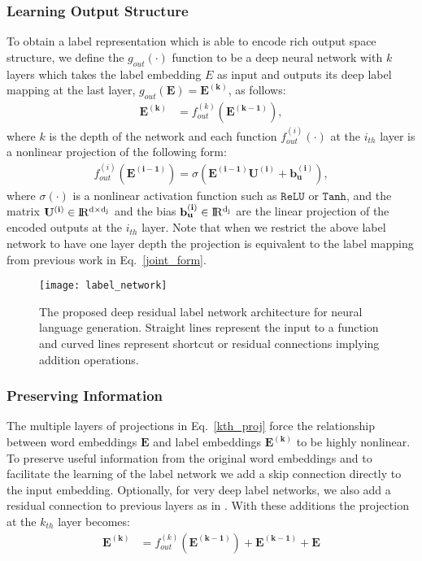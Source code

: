 \documentclass{article}
\begin{document}
\subsubsection{Learning Output Structure}
To obtain a label representation which is able to encode rich output space structure, we define the $g_{out}(\cdot)$ function to be a deep neural network with $k$ layers which takes the label embedding $E$ as input and outputs its deep label mapping at the last layer, $g_{out}(\mathbf{E}) = \mathbf{{E}^{(k)}}$,  as follows: 
\begin{align}
     \mathbf{{E}^{(k)}}    & = f^{(k)}_{out}(\mathbf{{E}^{(k-1)}}) \label{kth_proj}, 
\end{align}
\noindent where $k$ is the depth of the network and 
each function $f^{(i)}_{out}(\cdot)$ at the $i_{th}$ layer is a nonlinear projection of the following form: 
\begin{align}
    f^{(i)}_{out}(\mathbf{{E}^{(i-1)}}) = \sigma(\mathbf{E^{(i-1)}}\mathbf{U^{(i)}} + \mathbf{b^{(i)}_u}),
    \label{drill_proj}
\end{align}
where $\sigma(\cdot)$ is a nonlinear activation function such as $\texttt{ReLU}$ or $\texttt{Tanh}$, and the matrix $\mathbf{U^{(i)}} \in \rm I\!R^{d \times d_j}$ and the bias $\mathbf{b^{(i)}_{u}} \in \rm I\!R^{d_j}$ are the linear projection of the encoded outputs at the $i_{th}$ layer. Note that when we restrict the above label network to have  one layer depth the projection is equivalent to the label mapping from previous work in Eq.~\ref{joint_form}.


\begin{figure*}
 	\centering
 	\hspace{5mm}\texttt{[image: label\_network]}
 	\vspace{-2mm}
 	\caption{The proposed deep residual label network architecture for neural language generation. Straight lines represent the input to a function and curved lines represent shortcut or residual connections implying addition operations.}
 	\label{schema-mini}
\end{figure*}

\subsubsection{Preserving Information}
The multiple layers of projections in Eq.~\ref{kth_proj} force the relationship between word embeddings $\mathbf{E}$ and label embeddings $\mathbf{{E}^{(k)}}$ to be highly nonlinear. To preserve useful information from the original word embeddings and to facilitate the learning of the label network we add a skip connection directly to the input embedding. Optionally, for very deep label networks, we also add a residual connection to previous layers as in \citep{resnet15}. With these additions the projection at the $k_{th}$ layer becomes:
\begin{align} 
    \mathbf{{E}^{(k)}}    & = f^{(k)}_{out}(\mathbf{{E}^{(k-1)}}) + \mathbf{{E}^{(k-1)}} + \mathbf{E}
\end{align}
 
\end{document}
